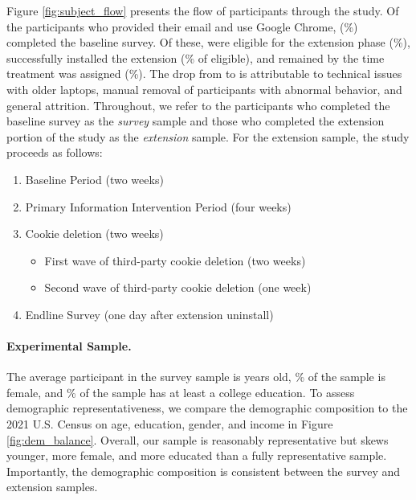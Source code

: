 \documentclass[12pt]{article}
\theoremstyle{definition}
\theoremstyle{remark}
\begin{document}
Figure \ref{fig:subject_flow} presents the flow of participants through the study. Of the \fullCohortN{} participants who provided their email and use Google Chrome, \baselineSurveyN{} (\baselineCompletionPct{}\%) completed the baseline survey. Of these, \eligibleN{} were eligible for the extension phase (\eligiblePct{}\%), \installedN{} successfully installed the extension (\installedPctOfEligible{}\% of eligible), and \remainedN{} remained by the time treatment was assigned (\remainedPct{}\%). The drop from \installedN{} to \remainedN{} is attributable to technical issues with older laptops, manual removal of participants with abnormal behavior, and general attrition. Throughout, we refer to the participants who completed the baseline survey as the \textit{survey} sample and those who completed the extension portion of the study as the \textit{extension} sample. For the extension sample, the study proceeds as follows:
\begin{enumerate}
\item Baseline Period (two weeks)
\item Primary Information Intervention Period (four weeks)
\item Cookie deletion (two weeks)
\begin{itemize}
    \item First wave of third-party cookie deletion (two weeks)
    \item Second wave of third-party cookie deletion (one week)
\end{itemize}
\item Endline Survey (one day after extension uninstall)
\end{enumerate}

\paragraph{Experimental Sample.} The average participant in the survey sample is \surveyMeanAge{} years old, \surveyFemalePct{}\% of the sample is female, and \surveyCollegePct{}\% of the sample has at least a college education. To assess demographic representativeness, we compare the demographic composition to the 2021 U.S. Census on age, education, gender, and income in Figure \ref{fig:dem_balance}. Overall, our sample is reasonably representative but skews younger, more female, and more educated than a fully representative sample. Importantly, the demographic composition is consistent between the survey and extension samples.
\end{document}
